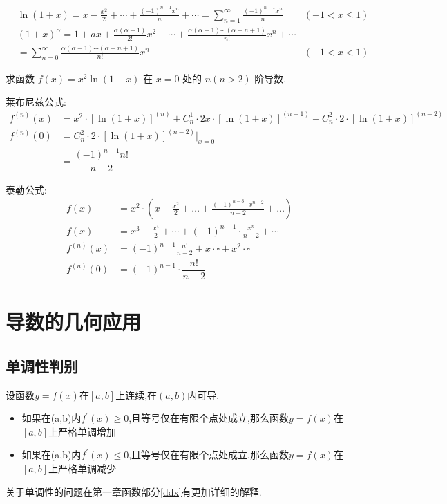 \documentclass[8pt a4paper, oneside, UTF8]{ctexbook}  %
\begin{document}
\begin{sloppypar}
\begin{center}
{$$\begin{aligned}
                     & \ln(1+x)=x-\frac{x^{2}}{2}+\cdots+\frac{(-1)^{n-1}x^{n}}{n}+\cdots=\sum_{n=1}^{\infty}\frac{(-1)^{n-1}x^{n}}{n}                 & (-1<x\leqslant1)    \\
                     & (1+x)^{\alpha}= 1+ax+\frac{\alpha(\alpha-1)}{2!}x^{2}+\cdots+\frac{\alpha(\alpha-1)\cdots(\alpha-n+1)}{n!}x^{n}+\cdots                                \\
                     & = \sum_{n=0}^{\infty}\frac{\alpha(\alpha-1)\cdots(\alpha-n+1)}{n!}x^{n}                                                         & (-1<x<1)
                \end{aligned}
            $$
        }
    \end{center}
    \begin{problem}
    求函数 $f(x)=x^2\ln(1+x)$ 在 $x=0$ 处的 $n(n>2)$ 阶导数.
    \end{problem}
    \begin{solution}{莱布尼兹公式:}
        \begin{align*}
            f^{(n)}(x) & = x^{2}\cdot[\ln(1+x)]^{(n)}+C_{n}^{1}\cdot2x\cdot[\ln(1+x)]^{(n-1)}+C_{n}^{2}\cdot2\cdot[\ln(1+x)]^{(n-2)} \\
            f^{(n)}(0) & =  C_{n}^{2}\cdot2\cdot[\ln(1+x)]^{(n-2)} |_{x=0}                                                           \\
                       & =  \dfrac{(-1)^{n-1}n!}{n-2}
        \end{align*}
    \end{solution}
    \begin{solution}{泰勒公式:}
        \begin{align*}
            f(x)       & = x^{2}\cdot(x-\frac{x^{2}}{2}+\ldots+\frac{(-1)^{n-3}\cdot x^{n-2}}{n-2}+\ldots) \\
            f(x)       & =   x^{3}-\frac{x^{4}}{2}+\cdots+(-1)^{n-1}\cdot\frac{x^{n}}{n-2}+\cdots          \\
            f^{(n)}(x) & =(-1)^{n-1}\frac{n!}{n-2}+x\cdot \square+x^{2}\cdot \square                       \\
            f^{(n)}(0) & =(-1)^{n-1}\cdot\dfrac{n!}{n-2}
        \end{align*}
    \end{solution}
    \section{导数的几何应用}
    \subsection{单调性判别}
    设函数$y=f(x)$在$[a,b]$上连续,在$(a,b)$内可导.
    \begin{itemize}
        \item 如果在(a,b)内$f^{\prime}(x)\geqslant0$,且等号仅在有限个点处成立,那么函数$y=f(x)$在$[a,b]$上严格单调增加
        \item 如果在(a,b)内$f^{\prime}(x)\leqslant0$,且等号仅在有限个点处成立,那么函数$y=f(x)$在$[a,b]$上严格单调减少
    \end{itemize}
    关于单调性的问题在第一章函数部分\ref{ddx}有更加详细的解释.

\end{sloppypar}
\end{document}
